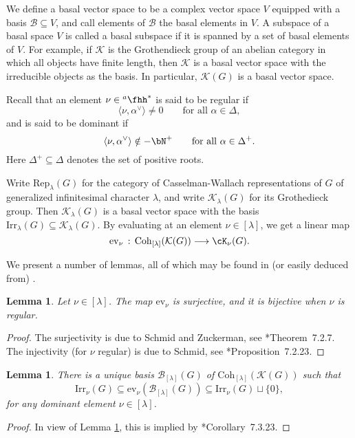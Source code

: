 \documentclass[12pt,a4paper]{amsart}
\def\subset{\subseteq}
\newcommand{\CK}{{\mathcal {K}}}
\newcommand{\la}{\langle}
\newcommand{\ra}{\rangle}
\numberwithin{equation}{section}
\newtheorem{lem}[thm]{Lemma}
\theoremstyle{remark}
\def\Irr{\mathrm{Irr}}
\def\hha{{}^a\fhh}
\def\Coh{\mathrm{Coh}}
\newcommand{\Lam}{{[\lambda]}}
\newcommand{\Grt}{\cK}
\begin{document}
We define a basal vector space to be a complex vector space $V$ equipped with a basis $\mathcal B\subset V$, and call elements of $\mathcal B$ the basal elements in $V$. A subspace of a basal space $V$ is called a basal subspace if it is spanned by a set of basal elements of $V$. For example, if $\CK$ is the Grothendieck group of an abelian category in which all objects have finite length, then $\CK$ is a basal vector space with the irreducible objects as the basis. In particular, $\CK(G)$ is a basal vector space.


Recall that an element $\nu\in \hha^*$ is said to be regular if
\[
    \la \nu, \alpha^\vee\ra\neq 0 \qquad\textrm{for all $\alpha\in \Delta$},
  \]
  and is said to be dominant if
\[
    \la \nu, \alpha^\vee\ra\notin -\bN^+ \qquad\textrm{for all $\alpha\in \Delta^+$}.
  \]
Here $ \Delta^+\subset \Delta$ denotes the set of positive roots.


Write $\mathrm{Rep}_\lambda(G)$ for the category of Casselman-Wallach representations of $G$ of generalized infinitesimal character $\lambda$, and write   $\CK_{\lambda}(G)$ for its  Grothedieck group. Then   $\CK_{\lambda}(G)$  is a basal vector space with the basis $\Irr_\lambda(G)\subset \CK_{\lambda}(G)$.
By evaluating at an element  $\nu\in \Lam$, we get a linear map
   \[
    \mathrm{ev}_{\nu } \, :\,  \Coh_{[\lambda]}(\CK(G)) \longrightarrow \Grt_{\nu}(G).
  \]

We present a number of lemmas, all of which may be found in (or easily deduced from) \cite{Vg,V4}.

 \begin{lem}\label{lem21}
Let  $\nu\in \Lam$. The map  $\mathrm{ev}_{\nu}$ is surjective, and it is bijective when $\nu$ is regular.
     \end{lem}
\begin{proof}
The surjectivity is due to Schmid and Zuckerman, see  \cite{Vg}*{Theorem~7.2.7}. The injectivity (for $\nu$ regular)  is due to Schmid, see \cite{Vg}*{Proposition~7.2.23}.
\end{proof}




\begin{lem}\label{lemirr}
There is a unique basis $\mathcal B_\Lam(G)$ of  $\Coh_{[\lambda]}(\CK(G))$ such that
\[
  \Irr_\nu(G)\subset  \mathrm{ev}_{\nu }(\mathcal B_\Lam(G))\subset \Irr_\nu(G)\sqcup \{0\},
\]
 for any dominant element $\nu\in \Lam$.
          \end{lem}
\begin{proof}
In view  of Lemma \ref{lem21}, this is implied by  \cite{Vg}*{Corollary~7.3.23}.
\end{proof}
\end{document}
